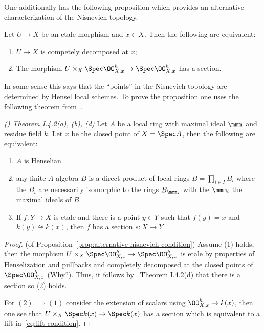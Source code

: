 \documentclass[12pt]{article}
\numberwithin{equation}{section}
\numberwithin{lemma}{section}
\numberwithin{theorem}{section}
\numberwithin{proposition}{section}
\numberwithin{corollary}{section}
\numberwithin{definition}{section}
\numberwithin{example}{section}
\numberwithin{remark}{section}
\begin{document}
One additionally has the following proposition which provides an
alternative characterization of the Nisnevich topology.
\begin{proposition}\label{prop:alternative-nisnevich-condition}
  Let $U \to X$ be an etale morphism and $x \in X$. Then the following
  are equivalent:
  \begin{enumerate}[label=(\arabic*)]
  \item $U \to X$ is competely decomposed at $x$;
  \item The morphism
    $U \times_X \Spec \OO^h_{X, x} \to \Spec \OO^h_{X, x}$ has a
    section.
  \end{enumerate}
\end{proposition}

In some sense this says that the ``points'' in the Nisnevich topology
are determined by Hensel local schemes. To prove the proposition one
uses the following theorem from~\cite{milne1980etale}.

\begin{theorem}{\emph{(\cite{milne1980etale}) Theorem I.4.2(a), (b), (d)}}
  Let $A$ be a local ring with maximal ideal $\mmm$ and residue field
  $k$. Let $x$ be the closed point of $X = \Spec A$, then the
  following are equivalent:
  \begin{enumerate}[label=(\alph*)]
  \item $A$ is Henselian
  \item any finite $A$-algebra $B$ is a direct product of local rings
    $B = \prod_{i \in I} B_i$ where the $B_i$ are necessarily
    isomorphic to the rings $B_{\mmm_i}$ with the $\mmm_i$ the maximal
    ideals of $B$.
  \item If $f : Y \to X$ is etale and there is a point $y \in Y$ such
    that $f(y) = x$ and $k(y) \cong k(x)$, then $f$ has a section
    $s : X \to Y$.
  \end{enumerate}
\end{theorem}

\begin{proof}{(of Proposition~\ref{prop:alternative-nisnevich-condition})}
  Assume (1) holds, then the morphism
  $U \times_X \Spec \OO^h_{X, x} \to \Spec \OO^h_{X, x}$ is etale by
  properties of Henselization and pullbacks and completely decomposed
  at the closed points of $\Spec \OO^h_{X, x}$ (Why?). Thus, it
  follows by~\cite{milne1980etale} Theorem I.4.2(d) that there is a
  section so (2) holds.

  For $(2) \implies (1)$ consider the extension of scalars using
  $\OO^{h}_{X, x} \to k(x)$, then one see that
  $U \times_X \Spec k(x) \to \Spec k(x)$ has a section which is
  equivalent to a lift in~\eqref{eq:lift-condition}.
\end{proof}
\end{document}

